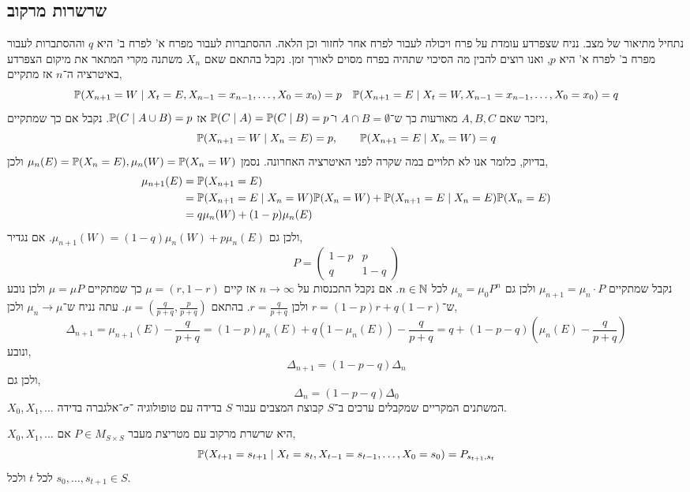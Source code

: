 \subsection{שרשרות מרקוב}
נתחיל מתיאור של מצב.
נניח שצפרדע עומדת על פרח ויכולה לעבור לפרח אחר לחזור וכן הלאה.
ההסתברות לעבור מפרח א' לפרח ב' היא $q$ וההסתברות לעבור מפרח ב' לפרח א' היא $p$, ואנו רוצים להבין מה הסיכוי שתהיה בפרח מסוים לאורך זמן.
נקבל בהתאם שאם $X_n$ משתנה מקרי המתאר את מיקום הצפרדע באיטרציה ה־$n$ אז מתקיים,
\[
	\mathbb{P}(X_{n + 1} = W \mid X_t = E, X_{n - 1} = x_{n - 1}, \ldots, X_0 = x_0) = p
	\quad
	\mathbb{P}(X_{n + 1} = E \mid X_t = W, X_{n - 1} = x_{n - 1}, \ldots, X_0 = x_0) = q
\]
ניזכר שאם $A, B, C$ מאורעות כך ש־$A \cap B = \emptyset$ ו־$\mathbb{P}(C \mid A) = \mathbb{P}(C \mid B) = p$ אז $\mathbb{P}(C \mid A \cup B) = p$.
נקבל אם כך שמתקיים,
\[
	\mathbb{P}(X_{n + 1} = W \mid X_n = E) = p,
	\qquad
	\mathbb{P}(X_{n + 1} = E \mid X_n = W) = q
\]
בדיוק, כלומר אנו לא תלויים במה שקרה לפני האיטרציה האחרונה.
נסמן $\mu_n(E) = \mathbb{P}(X_n = E), \mu_n(W) = \mathbb{P}(X_n = W)$ ולכן,
\begin{align*}
	\mu_{n + 1}(E)
	& = \mathbb{P}(X_{n + 1} = E) \\
	& = \mathbb{P}(X_{n + 1} = E \mid X_n = W) \mathbb{P}(X_n = W) + \mathbb{P}(X_{n + 1} = E \mid X_n = E) \mathbb{P}(X_n = E) \\
	& = q \mu_n(W) + (1 - p) \mu_n(E)
\end{align*}
ולכן גם $\mu_{n + 1}(W) = (1 - q) \mu_n(W) + p \mu_n(E)$.
אם נגדיר,
\[
	P = \begin{pmatrix}
		1 - p & p \\
		q & 1 - q
	\end{pmatrix}
\]
נקבל שמתקיים $\mu_{n + 1} = \mu_n \cdot P$ ולכן גם $\mu_n = \mu_0 P^n$ לכל $n \in \mathbb{N}$.
אם נקבל התכנסות על $n \to \infty$ אז קיים $\mu = (r, 1 - r)$ כך שמתקיים $\mu = \mu P$ ולכן נובע ש־$r = (1 - p) r + q (1 - r)$ ולכן $r = \frac{q}{p + q}$.
בהתאם $\mu = (\frac{q}{p + q}, \frac{p}{p + q})$.
עתה נניח ש־$\mu_n \to \mu$ ולכן,
\[
	\Delta_{n + 1}
	= \mu_{n + 1}(E) - \frac{q}{p + q}
	= (1 - p) \mu_n(E) + q (1 - \mu_n(E)) - \frac{q}{p + q}
	= q + (1 - p - q) (\mu_n(E) - \frac{q}{p + q})
\]
ונובע,
\[
	\Delta_{n + 1} = (1 - p - q) \Delta_n
\]
ולכן גם,
\[
	\Delta_n = (1 - p - q) \Delta_0
\]
$X_0, X_1, \ldots$ המשתנים המקריים שמקבלים ערכים ב־$S$ קבוצת המצבים עבור $S$ בדידה עם טופולוגיה ־$\sigma$־אלגברה בדידה.
\begin{definition}
	$X_0, X_1, \ldots$ היא שרשרת מרקוב עם מטריצת מעבר $P \in M_{S \times S}$ אם,
	\[
		\mathbb{P}(X_{t + 1} = s_{t + 1} \mid X_t = s_t, X_{t - 1} = s_{t - 1}, \ldots, X_0 = s_0) = P_{s_{t + 1}, s_t}
	\]
	לכל $t$ ולכל $s_0, \ldots, s_{t + 1} \in S$.
\end{definition}
